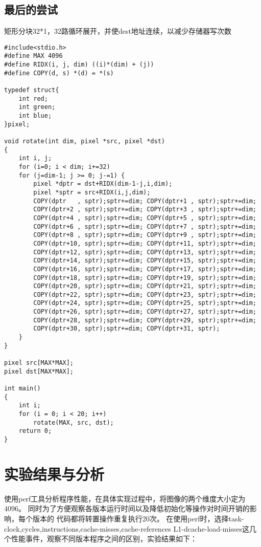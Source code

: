 \documentclass{article}
\begin{document}
\subsection{最后的尝试}
矩形分块32*1，32路循环展开，并使dest地址连续，以减少存储器写次数
\begin{lstlisting}
#include<stdio.h>
#define MAX 4096
#define RIDX(i, j, dim) ((i)*(dim) + (j))
#define COPY(d, s) *(d) = *(s)

typedef struct{
    int red; 
    int green; 
    int blue;
}pixel;

void rotate(int dim, pixel *src, pixel *dst)
{
    int i, j;
    for (i=0; i < dim; i+=32)
    for (j=dim-1; j >= 0; j-=1) {
        pixel *dptr = dst+RIDX(dim-1-j,i,dim);
        pixel *sptr = src+RIDX(i,j,dim);
        COPY(dptr   , sptr);sptr+=dim; COPY(dptr+1 , sptr);sptr+=dim;
        COPY(dptr+2 , sptr);sptr+=dim; COPY(dptr+3 , sptr);sptr+=dim;
        COPY(dptr+4 , sptr);sptr+=dim; COPY(dptr+5 , sptr);sptr+=dim;
        COPY(dptr+6 , sptr);sptr+=dim; COPY(dptr+7 , sptr);sptr+=dim;
        COPY(dptr+8 , sptr);sptr+=dim; COPY(dptr+9 , sptr);sptr+=dim;
        COPY(dptr+10, sptr);sptr+=dim; COPY(dptr+11, sptr);sptr+=dim;
        COPY(dptr+12, sptr);sptr+=dim; COPY(dptr+13, sptr);sptr+=dim;
        COPY(dptr+14, sptr);sptr+=dim; COPY(dptr+15, sptr);sptr+=dim;
        COPY(dptr+16, sptr);sptr+=dim; COPY(dptr+17, sptr);sptr+=dim;
        COPY(dptr+18, sptr);sptr+=dim; COPY(dptr+19, sptr);sptr+=dim;
        COPY(dptr+20, sptr);sptr+=dim; COPY(dptr+21, sptr);sptr+=dim;
        COPY(dptr+22, sptr);sptr+=dim; COPY(dptr+23, sptr);sptr+=dim;
        COPY(dptr+24, sptr);sptr+=dim; COPY(dptr+25, sptr);sptr+=dim;
        COPY(dptr+26, sptr);sptr+=dim; COPY(dptr+27, sptr);sptr+=dim;
        COPY(dptr+28, sptr);sptr+=dim; COPY(dptr+29, sptr);sptr+=dim;
        COPY(dptr+30, sptr);sptr+=dim; COPY(dptr+31, sptr);
    }
}

pixel src[MAX*MAX];
pixel dst[MAX*MAX];

int main() 
{
    int i;
    for (i = 0; i < 20; i++)
        rotate(MAX, src, dst);
    return 0;
}
\end{lstlisting}

\section{实验结果与分析}
使用perf工具分析程序性能，在具体实现过程中，将图像的两个维度大小定为4096。
同时为了方便观察各版本运行时间以及降低初始化等操作对时间开销的影响，每个版本的
代码都将转置操作重复执行20次。
\newline 在使用perf时，选择task-clock,cycles,instructions,cache-misses,cache-references
L1-dcache-load-misses这几个性能事件，观察不同版本程序之间的区别，实验结果如下：
\end{document}
